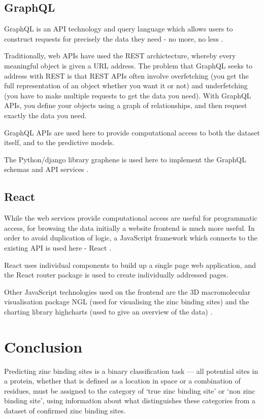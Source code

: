 \subsection{GraphQL}

GraphQL is an API technology and query language which allows users to construct requests for precisely the data they need - no more, no less \cite{graphql}.

Traditionally, web APIs have used the REST archictecture, whereby every meaningful object is given a URL address. The problem that GraphQL seeks to address with REST is that REST APIs often involve overfetching (you get the full representation of an object whether you want it or not) and underfetching (you have to make multiple requests to get the data you need). With GraphQL APIs, you define your objects using a graph of relationships, and then request exactly the data you need.

GraphQL APIs are used here to provide computational access to both the dataset itself, and to the predictive models.

The Python/django library graphene is used here to implement the GraphQL schemas and API services \cite{graphene}.

\subsection{React}

While the web services provide computational access are useful for programmatic access, for browsing the data initially a website frontend is much more useful. In order to avoid duplication of logic, a JavaScript framework which connects to the existing API is used here - React \cite{react}.

React uses individual components to build up a single page web application, and the React router package is used to create individually addressed pages.

Other JavaScript technologies used on the frontend are the 3D macromolecular visualisation package NGL (used for visualising the zinc binding sites) \cite{rose2015ngl} and the charting library highcharts (used to give an overview of the data) \cite{highcharts}.

\section{Conclusion}

Predicting zinc binding sites is a binary classification task --- all potential sites in a protein, whether that is defined as a location in space or a combination of residues, must be assigned to the category of `true zinc binding site' or `non zinc binding site', using information about what distinguishes these categories from a dataset of confirmed zinc binding sites.

